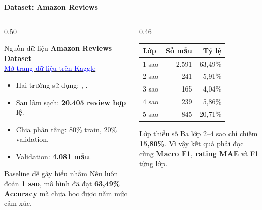 \documentclass[aspectratio=169]{beamer}
\newcommand{\codeword}[1]{\texttt{\detokenize{#1}}}
\begin{document}
\begin{frame}{\textbf{\large Dataset: Amazon Reviews}}
    \begin{columns}[T,onlytextwidth]
        \begin{column}{0.50\textwidth}
            \begin{block}{Nguồn dữ liệu}
                \textbf{Amazon Reviews Dataset}\\[0.12cm]
                \href{https://www.kaggle.com/datasets/dongrelaxman/amazon-reviews-dataset}
                {\textcolor{blue}{Mở trang dữ liệu trên Kaggle}}
            \end{block}

            \begin{itemize}
                \item Hai trường sử dụng: \codeword{Review Text}, \codeword{Rating}.
                \item Sau làm sạch: \textbf{20.405 review hợp lệ}.
                \item Chia phân tầng: 80\% train, 20\% validation.
                \item Validation: \textbf{4.081 mẫu}.
            \end{itemize}

            \begin{alertblock}{Baseline dễ gây hiểu nhầm}
                Nếu luôn đoán \textbf{1 sao}, mô hình đã đạt
                \textbf{63,49\% Accuracy} mà chưa học được năm mức cảm xúc.
            \end{alertblock}
        \end{column}

        \begin{column}{0.46\textwidth}
            \centering
            \small
            \begin{tabular}{lrr}
                \toprule
                \textbf{Lớp} & \textbf{Số mẫu} & \textbf{Tỷ lệ} \\
                \midrule
                1 sao & 2.591 & 63,49\% \\
                2 sao & 241 & 5,91\% \\
                3 sao & 165 & 4,04\% \\
                4 sao & 239 & 5,86\% \\
                5 sao & 845 & 20,71\% \\
                \bottomrule
            \end{tabular}

            \vspace{0.25cm}
            \begin{alertblock}{Lớp thiểu số}
                Ba lớp 2--4 sao chỉ chiếm \textbf{15,80\%}. Vì vậy kết quả phải
                đọc cùng \textbf{Macro F1}, \textbf{rating MAE} và F1 từng lớp.
            \end{alertblock}
        \end{column}
    \end{columns}
\end{frame}
\end{document}
